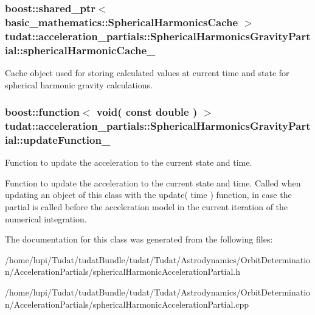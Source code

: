\subsubsection[{\texorpdfstring{spherical\+Harmonic\+Cache\+\_\+}{sphericalHarmonicCache_}}]{\setlength{\rightskip}{0pt plus 5cm}boost\+::shared\+\_\+ptr$<$ {\bf basic\+\_\+mathematics\+::\+Spherical\+Harmonics\+Cache} $>$ tudat\+::acceleration\+\_\+partials\+::\+Spherical\+Harmonics\+Gravity\+Partial\+::spherical\+Harmonic\+Cache\+\_\+\hspace{0.3cm}{\ttfamily [protected]}}\hypertarget{classtudat_1_1acceleration__partials_1_1SphericalHarmonicsGravityPartial_a0ec88f0ff9a7ae8115160915ce2f5598}{}\label{classtudat_1_1acceleration__partials_1_1SphericalHarmonicsGravityPartial_a0ec88f0ff9a7ae8115160915ce2f5598}
Cache object used for storing calculated values at current time and state for spherical harmonic gravity calculations. 
\subsubsection[{\texorpdfstring{update\+Function\+\_\+}{updateFunction_}}]{\setlength{\rightskip}{0pt plus 5cm}boost\+::function$<$ void( const double ) $>$ tudat\+::acceleration\+\_\+partials\+::\+Spherical\+Harmonics\+Gravity\+Partial\+::update\+Function\+\_\+\hspace{0.3cm}{\ttfamily [protected]}}\hypertarget{classtudat_1_1acceleration__partials_1_1SphericalHarmonicsGravityPartial_a3e659d0870f55c89d6c9254b43c4f21a}{}\label{classtudat_1_1acceleration__partials_1_1SphericalHarmonicsGravityPartial_a3e659d0870f55c89d6c9254b43c4f21a}


Function to update the acceleration to the current state and time. 

Function to update the acceleration to the current state and time. Called when updating an object of this class with the update( time ) function, in case the partial is called before the acceleration model in the current iteration of the numerical integration. 

The documentation for this class was generated from the following files\+:\begin{DoxyCompactItemize}
\item 
/home/lupi/\+Tudat/tudat\+Bundle/tudat/\+Tudat/\+Astrodynamics/\+Orbit\+Determination/\+Acceleration\+Partials/spherical\+Harmonic\+Acceleration\+Partial.\+h\item 
/home/lupi/\+Tudat/tudat\+Bundle/tudat/\+Tudat/\+Astrodynamics/\+Orbit\+Determination/\+Acceleration\+Partials/spherical\+Harmonic\+Acceleration\+Partial.\+cpp\end{DoxyCompactItemize}
